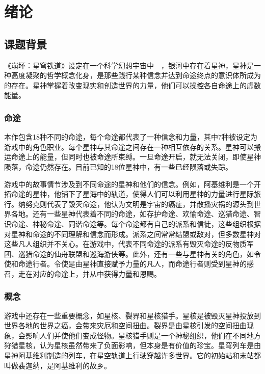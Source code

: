 \chapter{绪论}
\vspace{0.5cm}


\section{课题背景}

《崩坏：星穹铁道》设定在一个科学幻想宇宙中~\cite{exampleid1}~，银河中存在着星神，星神是一种高度凝聚的哲学概念化身，是那些践行某种信念并达到命途终点的意识体所成为的存在。星神掌握着改变现实和创造世界的力量，他们可以操控各自命途上的虚数能量。

\subsection{命途}

本作包含18种不同的命途，每个命途都代表了一种信念和力量，其中7种被设定为游戏中的角色职业。每个星神与其命途之间存在一种相互依存的关系。星神可以搬运命途上的能量，但同时也被命途所束缚。一旦命途开启，就无法关闭，即使星神陨落，命途仍然存在。目前已知的18位星神中，有一些已经陨落或失踪。

游戏中的故事情节涉及到不同命途的星神和他们的信念。例如，阿基维利是一个开拓命途的星神，他铺下了星海中的轨道，使得人们可以利用星神的力量进行星际旅行。纳努克则代表了毁灭命途，他认为文明是宇宙的癌症，并散播灾祸的源头到世界各地。还有一些星神代表着不同的命途，如存护命途、欢愉命途、巡猎命途、智识命途、神秘命途、同谐命途等。每个命途都有自己的派系和信徒，这些组织根据对星神和命途的不同理解和信念而形成。派系之间常常结盟或敌对，但多数星神对这些凡人组织并不关心。在游戏中，代表不同命途的派系有毁灭命途的反物质军团、巡猎命途的仙舟联盟和巡海游侠等。此外，还有一些与星神有关的角色，如令使和命途行者。令使是由星神直接赋予力量的凡人，而命途行者则受到星神的感召，走在对应的命途上，并从中获得力量和恩赐。

\subsection{概念}

游戏中还存在一些重要概念，如星核、裂界和星核猎手。星核是被毁灭星神投放到世界各地的世界之癌，会带来灾厄和空间扭曲。裂界是由星核引发的空间扭曲现象，会影响人们并使他们变成怪物。星核猎手则是一个神秘组织，他们在不同地方狩猎星核，认为星核虽然带来了负面影响，但本身是有价值的珍宝。星穹列车是由星神阿基维利制造的列车，在星空轨道上行驶穿越许多世界。它的初始站和末站都叫做裴迦纳，是阿基维利的故乡。

